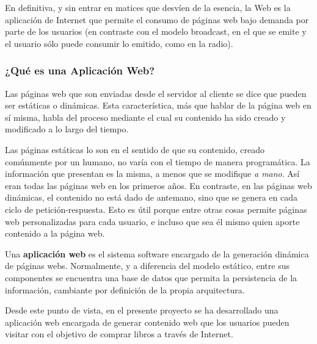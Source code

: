 \documentclass[a4paper]{article}
\begin{document}
    En definitiva, y sin entrar en matices que desvíen de la esencia, la Web es la aplicación de Internet que permite el consumo de páginas web bajo demanda por parte de los usuarios (en contraste con el modelo broadcast, en el que se emite y el usuario sólo puede consumir lo emitido, como en la radio).
    
    \subsubsection{¿Qué es una Aplicación Web?}
    
    
    
    
    Las páginas web que son enviadas desde el servidor al cliente se dice que pueden ser estáticas o dinámicas. Esta característica, más que hablar de la página web en sí misma, habla del proceso mediante el cual su contenido ha sido creado y modificado a lo largo del tiempo.
   	
   	Las páginas estáticas lo son en el sentido de que su contenido, creado comúnmente por un humano, no varía con el tiempo de manera programática. La información que presentan es la misma, a menos que se modifique \emph{a mano}. Así eran todas las páginas web en los primeros años. En contraste, en las páginas web dinámicas, el contenido no está dado de antemano, sino que se genera en cada ciclo de petición-respuesta. Esto es útil porque entre otras cosas permite páginas web personalizadas para cada usuario, e incluso que sea él mismo quien aporte contenido a la página web.
    
    Una \textbf{aplicación web} es el sistema software encargado de la generación dinámica de páginas webs. Normalmente, y a diferencia del modelo estático, entre sus componentes se encuentra una base de datos que permita la persistencia de la información, cambiante por definición de la propia arquitectura.
    
    Desde este punto de vista, en el presente proyecto se ha desarrollado una aplicación web encargada de generar contenido web que los usuarios pueden visitar con el objetivo de comprar libros a través de Internet.
\end{document}
